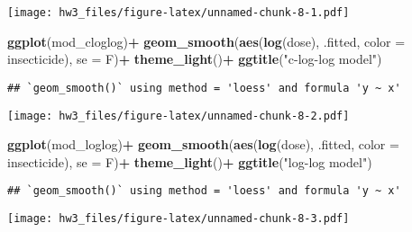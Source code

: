 \documentclass[
]{article}
\newenvironment{Shaded}{\begin{snugshade}}{\end{snugshade}}
\newcommand{\DataTypeTok}[1]{\textcolor[rgb]{0.13,0.29,0.53}{#1}}
\newcommand{\KeywordTok}[1]{\textcolor[rgb]{0.13,0.29,0.53}{\textbf{#1}}}
\newcommand{\NormalTok}[1]{#1}
\newcommand{\OperatorTok}[1]{\textcolor[rgb]{0.81,0.36,0.00}{\textbf{#1}}}
\newcommand{\StringTok}[1]{\textcolor[rgb]{0.31,0.60,0.02}{#1}}
\begin{document}
\texttt{[image: hw3\_files/figure-latex/unnamed-chunk-8-1.pdf]}

\begin{Shaded}
\begin{Highlighting}[]
\KeywordTok{ggplot}\NormalTok{(mod_cloglog)}\OperatorTok{+}
\StringTok{  }\KeywordTok{geom_smooth}\NormalTok{(}\KeywordTok{aes}\NormalTok{(}\KeywordTok{log}\NormalTok{(dose), .fitted, }\DataTypeTok{color =}\NormalTok{ insecticide), }\DataTypeTok{se =}\NormalTok{ F)}\OperatorTok{+}
\StringTok{  }\KeywordTok{theme_light}\NormalTok{()}\OperatorTok{+}
\StringTok{  }\KeywordTok{ggtitle}\NormalTok{(}\StringTok{"c-log-log model"}\NormalTok{)}
\end{Highlighting}
\end{Shaded}

\begin{verbatim}
## `geom_smooth()` using method = 'loess' and formula 'y ~ x'
\end{verbatim}

\texttt{[image: hw3\_files/figure-latex/unnamed-chunk-8-2.pdf]}

\begin{Shaded}
\begin{Highlighting}[]
\KeywordTok{ggplot}\NormalTok{(mod_loglog)}\OperatorTok{+}
\StringTok{  }\KeywordTok{geom_smooth}\NormalTok{(}\KeywordTok{aes}\NormalTok{(}\KeywordTok{log}\NormalTok{(dose), .fitted, }\DataTypeTok{color =}\NormalTok{ insecticide), }\DataTypeTok{se =}\NormalTok{ F)}\OperatorTok{+}
\StringTok{  }\KeywordTok{theme_light}\NormalTok{()}\OperatorTok{+}
\StringTok{  }\KeywordTok{ggtitle}\NormalTok{(}\StringTok{"log-log model"}\NormalTok{)}
\end{Highlighting}
\end{Shaded}

\begin{verbatim}
## `geom_smooth()` using method = 'loess' and formula 'y ~ x'
\end{verbatim}

\texttt{[image: hw3\_files/figure-latex/unnamed-chunk-8-3.pdf]}
\end{document}
